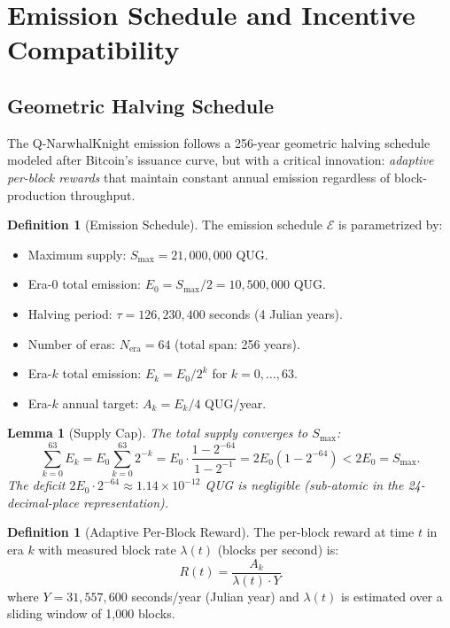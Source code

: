 \documentclass[11pt,a4paper]{article}
\newtheorem{lemma}[theorem]{Lemma}
\theoremstyle{definition}
\newtheorem{definition}[theorem]{Definition}
\theoremstyle{remark}
\newcommand{\QNK}{\textsf{Q-NarwhalKnight}}
\newcommand{\QUG}{\textsf{QUG}}
\newcommand{\reward}{R}
\newcommand{\emission}{\mathcal{E}}
\newcommand{\blockrate}{\lambda}
\begin{document}
\section{Emission Schedule and Incentive Compatibility}\label{sec:emission}

\subsection{Geometric Halving Schedule}

The \QNK{} emission follows a 256-year geometric halving schedule
modeled after Bitcoin's issuance curve, but with a critical innovation:
\emph{adaptive per-block rewards} that maintain constant annual emission
regardless of block-production throughput.

\begin{definition}[Emission Schedule]\label{def:emission-schedule}
The emission schedule $\emission$ is parametrized by:
\begin{itemize}[nosep]
  \item Maximum supply: $S_{\max} = 21{,}000{,}000$ \QUG{}.
  \item Era-0 total emission: $E_0 = S_{\max}/2 = 10{,}500{,}000$ \QUG{}.
  \item Halving period: $\tau = 126{,}230{,}400$ seconds (4 Julian years).
  \item Number of eras: $N_{\text{era}} = 64$ (total span: 256 years).
  \item Era-$k$ total emission: $E_k = E_0 / 2^k$ for $k = 0, \ldots, 63$.
  \item Era-$k$ annual target: $A_k = E_k / 4$ \QUG{}/year.
\end{itemize}
\end{definition}

\begin{lemma}[Supply Cap]\label{lem:supply-cap}
The total supply converges to $S_{\max}$:
\[
  \sum_{k=0}^{63} E_k = E_0 \sum_{k=0}^{63} 2^{-k}
  = E_0 \cdot \frac{1 - 2^{-64}}{1 - 2^{-1}}
  = 2E_0 (1 - 2^{-64})
  < 2E_0 = S_{\max}.
\]
The deficit $2E_0 \cdot 2^{-64} \approx 1.14 \times 10^{-12}$ \QUG{}
is negligible (sub-atomic in the 24-decimal-place representation).
\end{lemma}

\begin{definition}[Adaptive Per-Block Reward]\label{def:adaptive-reward}
The per-block reward at time $t$ in era $k$ with measured block rate
$\blockrate(t)$ (blocks per second) is:
\begin{equation}\label{eq:reward}
  \reward(t) = \frac{A_k}{\blockrate(t) \cdot Y}
\end{equation}
where $Y = 31{,}557{,}600$ seconds/year (Julian year) and $\blockrate(t)$
is estimated over a sliding window of 1{,}000 blocks.
\end{definition}
\end{document}
